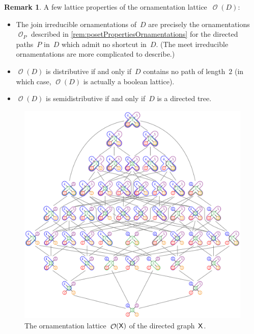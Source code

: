 \documentclass{amsart}
\theoremstyle{definition}
\newtheorem{remark}[theorem]{Remark}
\renewcommand{\c}[1]{\mathcal{#1}} %
\DeclareMathOperator{\Orn}{\c{O}}  %
\newcommand{\Xgraph}{\sf X} %
\begin{document}
\begin{remark}
A few lattice properties of the ornamentation lattice~$\Orn(D)$:
\begin{itemize}
\item The join irreducible ornamentations of~$D$ are precisely the ornamentations~$\Orn_P$ described in \cref{rem:posetPropertiesOrnamentations} for the directed paths~$P$ in~$D$ which admit no shortcut in~$D$. (The meet irreducible ornamentations are more complicated to describe.)
\item $\Orn(D)$ is distributive if and only if~$D$ contains no path of length~$2$ (in which case, $\Orn(D)$ is actually a boolean lattice).
\item $\Orn(D)$ is semidistributive if and only if~$D$ is a directed tree.
\end{itemize}
\end{remark}

\begin{figure}[p]
	\centerline{\includegraphics[scale=.8]{ornamentationsX}}
	\caption{The ornamentation lattice~$\Orn(\Xgraph)$ of the directed graph~$\Xgraph$.}
	\label{fig:ornamentationsX}
\end{figure}
\end{document}
